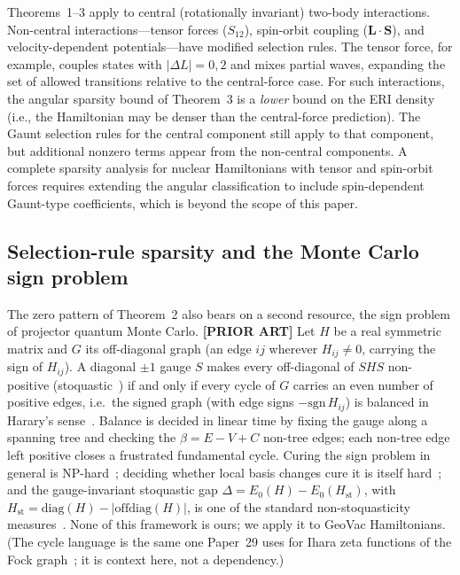 \documentclass[twocolumn,pra,amsmath,amssymb,superscriptaddress]{revtex4-2}
\begin{document}
Theorems~1--3 apply to central (rotationally invariant) two-body
interactions.  Non-central interactions---tensor forces
($S_{12}$), spin-orbit coupling ($\mathbf{L} \cdot \mathbf{S}$),
and velocity-dependent potentials---have modified selection rules.
The tensor force, for example, couples states with
$|\Delta L| = 0, 2$ and mixes partial waves, expanding the set of
allowed transitions relative to the central-force case.  For such
interactions, the angular sparsity bound of Theorem~3 is a
\textit{lower} bound on the ERI density (i.e., the Hamiltonian
may be denser than the central-force prediction).  The Gaunt
selection rules for the central component still apply to that
component, but additional nonzero terms appear from the non-central
components.  A complete sparsity analysis for nuclear Hamiltonians
with tensor and spin-orbit forces requires extending the angular
classification to include spin-dependent Gaunt-type coefficients,
which is beyond the scope of this paper.

\subsection{Selection-rule sparsity and the Monte Carlo sign problem}
\label{sec:sign_holonomy}

The zero pattern of Theorem~2 also bears on a second resource, the
sign problem of projector quantum Monte Carlo.  \textbf{[PRIOR ART]}
Let $H$ be a real symmetric matrix and $G$ its off-diagonal graph
(an edge $ij$ wherever $H_{ij}\neq 0$, carrying the sign of $H_{ij}$).
A diagonal $\pm1$ gauge $S$ makes every off-diagonal of $SHS$
non-positive (stoquastic~\cite{Bravyi2008}) if and only if every cycle
of $G$ carries an even number of positive edges, i.e.\ the signed graph
(with edge signs $-\mathrm{sgn}\,H_{ij}$) is balanced in Harary's
sense~\cite{Harary1953}.  Balance is decided in linear time by fixing
the gauge along a spanning tree and checking the $\beta=E-V+C$
non-tree edges; each non-tree edge left positive closes a frustrated
fundamental cycle.  Curing the sign problem in general is
NP-hard~\cite{TroyerWiese2005}; deciding whether local basis changes
cure it is itself hard~\cite{KlassenTerhal2019, MarvianLidarHen2019};
and the gauge-invariant stoquastic gap
$\Delta=E_0(H)-E_0(H_{\mathrm{st}})$, with
$H_{\mathrm{st}}=\mathrm{diag}(H)-|\mathrm{offdiag}(H)|$, is one of the
standard non-stoquasticity measures~\cite{Hangleiter2020}.  None of
this framework is ours; we apply it to GeoVac Hamiltonians.  (The
cycle language is the same one Paper~29 uses for Ihara zeta functions
of the Fock graph~\cite{GeoVac_Paper29}; it is context here, not a
dependency.)
\end{document}
